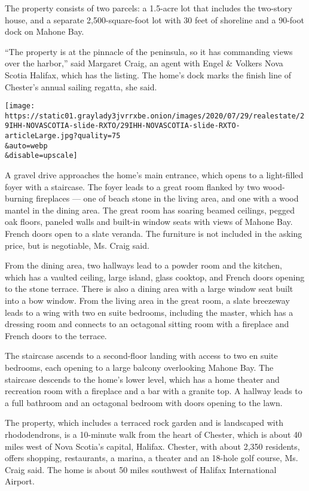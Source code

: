 The property consists of two parcels: a 1.5-acre lot that includes the
two-story house, and a separate 2,500-square-foot lot with 30 feet of
shoreline and a 90-foot dock on Mahone Bay.

``The property is at the pinnacle of the peninsula, so it has commanding
views over the harbor,'' said Margaret Craig, an agent with Engel \&
Volkers Nova Scotia Halifax, which has the listing. The home's dock
marks the finish line of Chester's annual sailing regatta, she said.

\texttt{[image: https://static01.graylady3jvrrxbe.onion/images/2020/07/29/realestate/29IHH-NOVASCOTIA-slide-RXTO/29IHH-NOVASCOTIA-slide-RXTO-articleLarge.jpg?quality=75\\\&auto=webp\\\&disable=upscale]}

A gravel drive approaches the home's main entrance, which opens to a
light-filled foyer with a staircase. The foyer leads to a great room
flanked by two wood-burning fireplaces --- one of beach stone in the
living area, and one with a wood mantel in the dining area. The great
room has soaring beamed ceilings, pegged oak floors, paneled walls and
built-in window seats with views of Mahone Bay. French doors open to a
slate veranda. The furniture is not included in the asking price, but is
negotiable, Ms. Craig said.

From the dining area, two hallways lead to a powder room and the
kitchen, which has a vaulted ceiling, large island, glass cooktop, and
French doors opening to the stone terrace. There is also a dining area
with a large window seat built into a bow window. From the living area
in the great room, a slate breezeway leads to a wing with two en suite
bedrooms, including the master, which has a dressing room and connects
to an octagonal sitting room with a fireplace and French doors to the
terrace.

The staircase ascends to a second-floor landing with access to two en
suite bedrooms, each opening to a large balcony overlooking Mahone Bay.
The staircase descends to the home's lower level, which has a home
theater and recreation room with a fireplace and a bar with a granite
top. A hallway leads to a full bathroom and an octagonal bedroom with
doors opening to the lawn.

The property, which includes a terraced rock garden and is landscaped
with rhododendrons, is a 10-minute walk from the heart of Chester, which
is about 40 miles west of Nova Scotia's capital, Halifax. Chester, with
about 2,350 residents, offers shopping, restaurants, a marina, a theater
and an 18-hole golf course, Ms. Craig said. The home is about 50 miles
southwest of Halifax International Airport.

